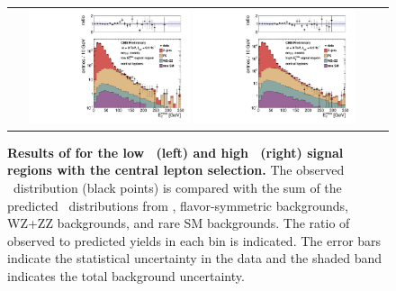 \begin{figure}[!h]
\begin{center}
\begin{tabular}{cc}
\includegraphics[width=0.45\textwidth]{plots/edge_pfmet_pt40_lowMet_central_all.pdf}
\includegraphics[width=0.45\textwidth]{plots/edge_pfmet_pt40_highMet_central_all.pdf}
\end{tabular}
\caption{\footnotesize {\bf Results of for the low \MET\ (left) and high \MET\ (right) signal regions with the central lepton selection.}
The observed \MET\ distribution (black points) is compared with the sum of the predicted \MET\
distributions from \zjets, flavor-symmetric backgrounds, WZ+ZZ backgrounds, and rare SM backgrounds. 
The ratio of observed to predicted yields in each bin is
indicated. The error bars indicate the statistical uncertainty in the data and the shaded band indicates the total background uncertainty.
\label{fig:results_fulledge_central}
}
\end{center}
\end{figure}

